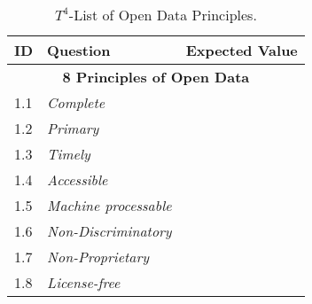 \begin{table}[t]
\scriptsize
\renewcommand{\arraystretch}{1.3}
\begin{center}
\begin{tabular}[c]{|l|p{5cm}|c|} 
\hline
  \textbf{ID} & \textbf{Question} &  \textbf{Expected Value}  \\\hline
  \multicolumn{3}{|c|}{\textbf{8 Principles of Open Data}}  \\ \hline
   1.1& \textit{Complete} & \si  \\ \hline
   1.2&\textit{Primary} & \si  \\ \hline  
   1.3&\textit{Timely} & \si  \\ \hline  
   1.4&\textit{Accessible} & \si  \\ \hline  
   1.5&\textit{Machine processable} & \si  \\ \hline  
   1.6&\textit{Non-Discriminatory} & \si  \\ \hline  
   1.7&\textit{Non-Proprietary} &\si  \\ \hline
   1.8&\textit{License-free} & \si  \\ \hline                                                               
  \hline
  \end{tabular}
 \caption{$T^{4}$-List of Open Data Principles.}
  \label{table:validation-t4}
  \end{center}
\end{table} 



